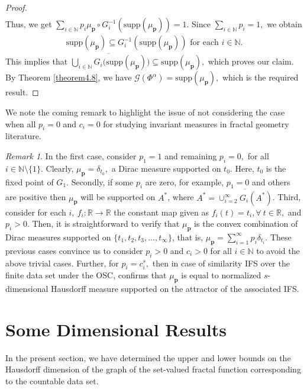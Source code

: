 \documentclass[12pt,oneside,reqno]{amsart}
\theoremstyle{definition}
\theoremstyle{remark}
\newtheorem{remark}[theorem]{Remark}
\begin{document}
\begin{proof}
\begin{align*}
  \end{align*}
Thus, we get $\sum_{i\in\mathbb{N}}p_{i}\mu_{\boldsymbol{p}}\circ G_i^{-1} (\text{supp}(\mu_{\boldsymbol{p}}))=1$. Since $\sum_{i \in \mathbb{N}}p_{i}=1,$ we obtain 
\begin{align*}
    \text{supp}(\mu_{\boldsymbol{p}}) \subseteq  G_i^{-1} (\text{supp}(\mu_{\boldsymbol{p}}))\text{ for each } i \in \mathbb{N}.
\end{align*}
This implies that  $\overline{\bigcup_{i
  \in \mathbb{N}}G_i(\text{supp}(\mu_{\boldsymbol{p}})})\subseteq \text{supp}(\mu_{\boldsymbol{p}}),$ which proves our claim. By Theorem \ref{theorem4.8}, we have $\mathcal{G}(\Phi^\alpha)=\text{supp}(\mu_{\boldsymbol{p}}),$ which is the required result. 
  \end{proof}
We note the coming remark to highlight the issue of not considering the case when all $p_i=0$ and $c_i=0$ for studying invariant measures in fractal geometry literature.
 \begin{remark}
     In the first case, consider $p_1=1$ and remaining $p_i=0,$ for all $i\in \mathbb{N} \setminus\{1\}.$ Clearly, $\mu_{\boldsymbol{p}}=\delta_{t_0},$ a Dirac measure supported on $t_0.$ Here, $t_0$ is the fixed point of $G_1.$ Secondly, if some $p_i$ are zero, for example, $p_1=0$ and others are positive then $\mu_{\boldsymbol{p}}$ will be supported on $A^*$, where $A^* =\overline{\cup_{i=2}^{\infty} G_i(A^*)}$.  Third, consider for each $i,\ f_i:\mathbb{R}\rightarrow\mathbb{R}$ the constant map given as $f_i(t)=t_i, \forall \ t\in \mathbb{R},$ and $p_i>0.$ Then, it is straightforward to verify that $\mu_{\boldsymbol{p}}$ is the convex combination of Dirac measures supported on $\{t_1,t_2,t_3,\dots,t_{\infty}\}$, that is, $\mu_{\boldsymbol{p}}=\sum_{i=1}^{\infty}p_i\delta_{t_i}.$ These previous cases convince us to consider $p_i>0$ and $c_i>0$ for all $i \in \mathbb{N}$ to avoid the above trivial cases. Further, for $p_i=c_i^s,$ then in case of similarity IFS over the finite data set under the OSC, \cite{Moran} confirms that $\mu_{\boldsymbol{p}}$ is equal to normalized $s$-dimensional Hausdorff measure supported on the attractor of the associated IFS. 
     
 \end{remark}



 \section{Some Dimensional Results}
 In the present section, we have determined the upper and lower bounds on the Hausdorff dimension of the graph of the set-valued fractal function corresponding to the countable data set.
\end{document}
